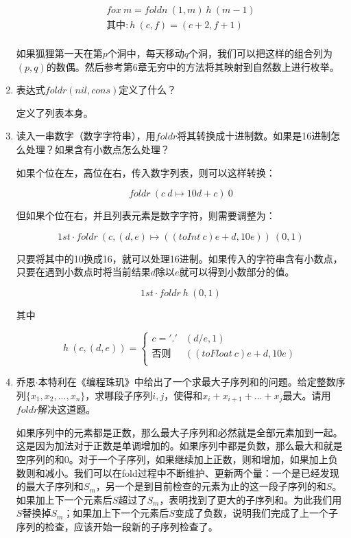 \documentclass[UTF8]{article}
\begin{document}
\begin{enumerate}
\[
\begin{array}{l}
fox\ m = foldn\ (1, m)\ h\ (m - 1) \\
\text{其中}: h\ (c, f) = (c + 2, f + 1) \\
\end{array}
\]

如果狐狸第一天在第$p$个洞中，每天移动$q$个洞，我们可以把这样的组合列为$(p, q)$的数偶。然后参考第6章无穷中的方法将其映射到自然数上进行枚举。

\item 表达式$foldr(nil, cons)$定义了什么？

定义了列表本身。

\item 读入一串数字（数字字符串），用$foldr$将其转换成十进制数。如果是16进制怎么处理？如果含有小数点怎么处理？

如果个位在左，高位在右，传入数字列表，则可以这样转换：

\[
foldr\ (c\ d \mapsto 10d + c)\ 0
\]

但如果个位在右，并且列表元素是数字字符，则需要调整为：

\[
1st \cdot foldr\ (c, (d, e) \mapsto ((toInt\ c)e + d, 10e))\ (0, 1)
\]

只要将其中的10换成16，就可以处理16进制。如果传入的字符串含有小数点，只要在遇到小数点时将当前结果$d$除以$e$就可以得到小数部分的值。

\[
1st \cdot foldr\ h\ (0, 1)
\]

其中

\[
h\ (c, (d, e)) = \begin{cases}
c = '.' & (d / e, 1) \\
\text{否则} & ((toFloat\ c)e + d, 10e) \\
\end{cases}
\]

\item 乔恩$\cdot$本特利在《编程珠玑》中给出了一个求最大子序列和的问题。给定整数序列$\{x_1, x_2, ..., x_n\}$，求哪段子序列$i, j$，使得和$x_i + x_{i+1} + ... + x_j$最大。请用$foldr$解决这道题。

如果序列中的元素都是正数，那么最大子序列和必然就是全部元素加到一起。这是因为加法对于正数是单调增加的。如果序列中都是负数，那么最大和就是空序列的和0。对于一个子序列，如果继续加上正数，则和增加，如果加上负数则和减小。我们可以在fold过程中不断维护、更新两个量：一个是已经发现的最大子序列和$S_m$，另一个是到目前检查的元素为止的这一段子序列的和$S$。如果加上下一个元素后$S$超过了$S_m$，表明找到了更大的子序列和。为此我们用$S$替换掉$S_m$；如果加上下一个元素后$S$变成了负数，说明我们完成了上一个子序列的检查，应该开始一段新的子序列检查了。


\end{enumerate}
\end{document}
